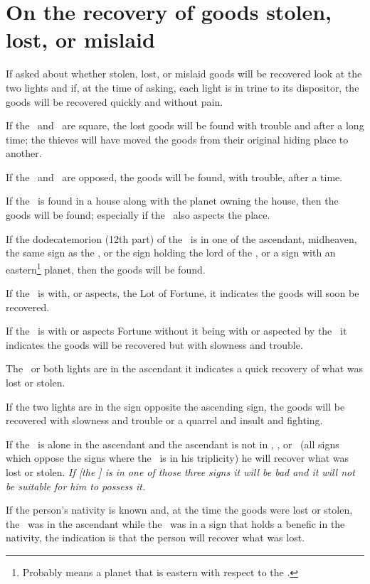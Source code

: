 \section{On the recovery of goods stolen, lost, or mislaid}
If asked about whether stolen, lost, or mislaid goods will be recovered look at the two lights and if, at the time of asking, each light is in trine to its dispositor, the goods will be recovered quickly and without pain.

If the \Sun\, and \Moon\, are square, the lost goods will be found with trouble and after a long time; the thieves will have moved the goods from their original hiding place to another.

If the \Sun\, and \Moon\, are opposed, the goods will be found, with trouble, after a time.

If the \Moon\, is found in a house along with the planet owning the house, then the goods will be found; especially if the \Sun\, also aspects the place.

If the dodecatemorion (12th part) of the \Moon\, is in one of the ascendant, midheaven, the same sign as the \Sun, or the sign holding the lord of the \Moon, or a sign with an eastern\footnote{Probably means a planet that is eastern with respect to the \Sun.} planet, then the goods will be found.

If the \Sun\, is with, or aspects, the Lot of Fortune, it indicates the goods will soon be recovered.

If the \Moon\, is with or aspects Fortune without it being with or aspected by the \Sun\, it indicates the goods will be recovered but with slowness and trouble.

The \Moon\, or both lights are in the ascendant it indicates a quick recovery of what was lost or stolen.

If the two lights are in the sign opposite the ascending sign, the goods will be recovered  with slowness and trouble or a quarrel and insult and fighting.

If the \Sun\, is alone in the ascendant and the ascendant is not in \Aquarius, \Gemini, or \Libra\, (all signs which oppose the signs where the \Sun\, is in his triplicity) he will recover what was lost or stolen. \textsl{If [the \Sun] is in one of those three signs it will be bad and it will not be suitable for him to possess it.}

If the person's nativity is known and, at the time the goods were lost or stolen, the \Sun\, was in the ascendant while the \Moon\, was in a sign that holds a benefic in the nativity, the indication is that the person will recover what was lost.

